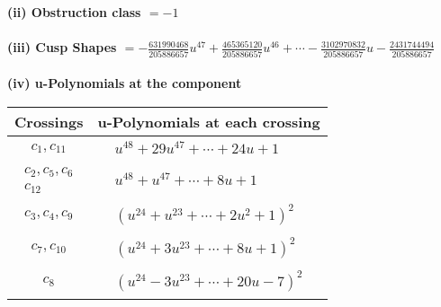 \documentclass[1p]{elsarticle_modified}
\theoremstyle{definition}
\begin{document}
\flushleft \textbf{(ii) Obstruction class $= -1$}\\~\\
\flushleft \textbf{(iii) Cusp Shapes $= -\frac{631990468}{205886657} u^{47}+\frac{465365120}{205886657} u^{46}+\cdots-\frac{3102970832}{205886657} u-\frac{2431744494}{205886657}$}\\~\\
\newpage\renewcommand{\arraystretch}{1}
\flushleft \textbf{(iv) u-Polynomials at the component}\newline \\
\begin{tabular}{m{50pt}|m{274pt}}
Crossings & \hspace{64pt}u-Polynomials at each crossing \\
\hline $$\begin{aligned}c_{1},c_{11}\end{aligned}$$&$\begin{aligned}
&u^{48}+29 u^{47}+\cdots+24 u+1
\end{aligned}$\\
\hline $$\begin{aligned}c_{2},c_{5},c_{6}\\c_{12}\end{aligned}$$&$\begin{aligned}
&u^{48}+u^{47}+\cdots+8 u+1
\end{aligned}$\\
\hline $$\begin{aligned}c_{3},c_{4},c_{9}\end{aligned}$$&$\begin{aligned}
&(u^{24}+u^{23}+\cdots+2 u^2+1)^{2}
\end{aligned}$\\
\hline $$\begin{aligned}c_{7},c_{10}\end{aligned}$$&$\begin{aligned}
&(u^{24}+3 u^{23}+\cdots+8 u+1)^{2}
\end{aligned}$\\
\hline $$\begin{aligned}c_{8}\end{aligned}$$&$\begin{aligned}
&(u^{24}-3 u^{23}+\cdots+20 u-7)^{2}
\end{aligned}$\\
\hline
\end{tabular}\\~\\
\newpage\renewcommand{\arraystretch}{1}
\end{document}
